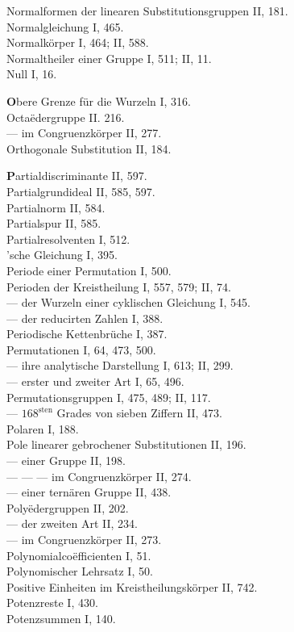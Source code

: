 
\noindent
Normalformen der linearen Substitutionsgruppen II, 181.\\
Normalgleichung I, 465.\\
Normalkörper I, 464; II, 588.\\
Normaltheiler einer Gruppe I, 511; II, 11.\\
Null I, 16.

\medskip
\noindent
\textbf{O}bere Grenze für die Wurzeln I, 316.\\
Octa\"edergruppe II. 216.\\ %
--- im Congruenzkörper II, 277.\\
Orthogonale Substitution II, 184.

\medskip
\noindent
\textbf{P}artialdiscriminante II, 597.\\
Partialgrundideal II, 585, 597.\\
Partialnorm II, 584.\\
Partialspur II, 585.\\
Partialresolventen I, 512.\\
'sche Gleichung I, 395.\\
Periode einer Permutation I, 500.\\
Perioden der Kreistheilung I, 557, 579; II, 74.\\
--- der Wurzeln einer cyklischen Gleichung I, 545.\\
--- der reducirten Zahlen I, 388.\\
Periodische Kettenbrüche I, 387.\\
Permutationen I, 64, 473, 500.\\
--- ihre analytische Darstellung I, 613; II, 299.\\
--- erster und zweiter Art I, 65, 496.\\
Permutationsgruppen I, 475, 489; II, 117.\\
--- $168^{\mathrm{sten}}$ Grades von sieben Ziffern II, 473.\\
Polaren I, 188.\\
Pole linearer gebrochener Substitutionen II, 196.\\
--- einer Gruppe II, 198.\\
--- --- --- im Congruenzkörper II, 274.\\
--- einer ternären Gruppe II, 438.\\
Poly\"edergruppen II, 202.\\
--- der zweiten Art II, 234.\\
--- im Congruenzkörper II, 273.\\
Polynomialco\"efficienten I, 51.\\
Polynomischer Lehrsatz I, 50.\\
Positive Einheiten im Kreistheilungskörper II, 742.\\
Potenzreste I, 430.\\
Potenzsummen I, 140.


